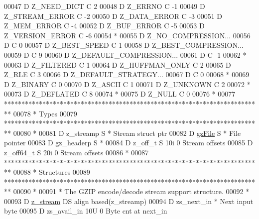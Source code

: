 \begin{DoxyCode}
00047      D Z\_NEED\_DICT     C                   2
00048      D Z\_ERRNO         C                   -1
00049      D Z\_STREAM\_ERROR  C                   -2
00050      D Z\_DATA\_ERROR    C                   -3
00051      D Z\_MEM\_ERROR     C                   -4
00052      D Z\_BUF\_ERROR     C                   -5
00053      D Z\_VERSION\_ERROR C                   -6
00054       *
00055      D Z\_NO\_COMPRESSION...
00056      D                 C                   0
00057      D Z\_BEST\_SPEED    C                   1
00058      D Z\_BEST\_COMPRESSION...
00059      D                 C                   9
00060      D Z\_DEFAULT\_COMPRESSION...
00061      D                 C                   -1
00062       *
00063      D Z\_FILTERED      C                   1
00064      D Z\_HUFFMAN\_ONLY  C                   2
00065      D Z\_RLE           C                   3
00066      D Z\_DEFAULT\_STRATEGY...
00067      D                 C                   0
00068       *
00069      D Z\_BINARY        C                   0
00070      D Z\_ASCII         C                   1
00071      D Z\_UNKNOWN       C                   2
00072       *
00073      D Z\_DEFLATED      C                   8
00074       *
00075      D Z\_NULL          C                   0
00076       *
00077       **************************************************************************
00078       *                                 Types
00079       **************************************************************************
00080       *
00081      D z\_streamp       S               *                                        Stream struct ptr
00082      D \hyperlink{structgz_file__s}{gzFile}          S               *                                        File pointer
00083      D gz\_headerp      S               *
00084      D z\_off\_t         S             10i 0                                      Stream offsets
00085      D z\_off64\_t       S             20i 0                                      Stream offsets
00086       *
00087       **************************************************************************
00088       *                               Structures
00089       **************************************************************************
00090       *
00091       *  The GZIP encode/decode stream support structure.
00092       *
00093      D \hyperlink{structz__stream__s}{z\_stream}        DS                  align based(z\_streamp)
00094      D  zs\_next\_in                     *                                        Next input byte
00095      D  zs\_avail\_in                  10U 0                                      Byte cnt at next\_in

\end{DoxyCode}
